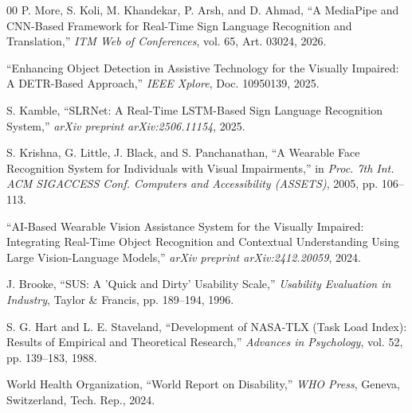 \documentclass[conference]{IEEEtran}
\begin{document}
\begin{thebibliography}{00}
 P. More, S. Koli, M. Khandekar, P. Arsh, and D. Ahmad, ``A MediaPipe and CNN-Based Framework for Real-Time Sign Language Recognition and Translation,'' \textit{ITM Web of Conferences}, vol. 65, Art. 03024, 2026.

 ``Enhancing Object Detection in Assistive Technology for the Visually Impaired: A DETR-Based Approach,'' \textit{IEEE Xplore}, Doc. 10950139, 2025.

 S. Kamble, ``SLRNet: A Real-Time LSTM-Based Sign Language Recognition System,'' \textit{arXiv preprint arXiv:2506.11154}, 2025.

 S. Krishna, G. Little, J. Black, and S. Panchanathan, ``A Wearable Face Recognition System for Individuals with Visual Impairments,'' in \textit{Proc. 7th Int. ACM SIGACCESS Conf. Computers and Accessibility (ASSETS)}, 2005, pp. 106--113.

 ``AI-Based Wearable Vision Assistance System for the Visually Impaired: Integrating Real-Time Object Recognition and Contextual Understanding Using Large Vision-Language Models,'' \textit{arXiv preprint arXiv:2412.20059}, 2024.

 J. Brooke, ``SUS: A 'Quick and Dirty' Usability Scale,'' \textit{Usability Evaluation in Industry}, Taylor \& Francis, pp. 189--194, 1996.

 S. G. Hart and L. E. Staveland, ``Development of NASA-TLX (Task Load Index): Results of Empirical and Theoretical Research,'' \textit{Advances in Psychology}, vol. 52, pp. 139--183, 1988.

 World Health Organization, ``World Report on Disability,'' \textit{WHO Press}, Geneva, Switzerland, Tech. Rep., 2024.

\end{thebibliography}
\end{document}
